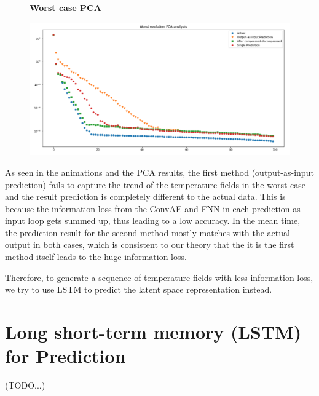 \begin{figure}[H]
    \textbf{Worst case PCA}\par\medskip
    \includegraphics[scale=0.5]{Report LaTeX/figures/mantle_convection_images/Worst_case_PCA_FNN.png}
\end{figure}

As seen in the animations and the PCA results, the first method (output-as-input prediction) fails to capture the trend of the temperature fields in the worst case and the result prediction is completely different to the actual data. This is because the information loss from the ConvAE and FNN in each prediction-as-input loop gets summed up, thus leading to a low accuracy. In the mean time, the prediction result for the second method mostly matches with the actual output in both cases, which is consistent to our theory that the it is the first method itself leads to the huge information loss.

Therefore, to generate a sequence of temperature fields with less information loss, we try to use LSTM to predict the latent space representation instead.


\section{Long short-term memory (LSTM) for Prediction}

(TODO...)